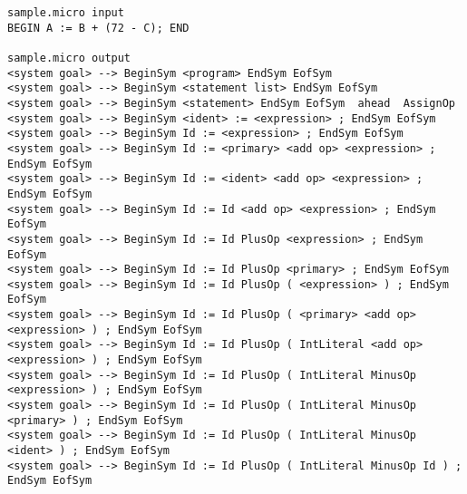 \documentclass[a4paper]{article}
\begin{document}
\begin{verbatim}
sample.micro input
BEGIN A := B + (72 - C); END

sample.micro output
<system goal> --> BeginSym <program> EndSym EofSym
<system goal> --> BeginSym <statement list> EndSym EofSym
<system goal> --> BeginSym <statement> EndSym EofSym  ahead  AssignOp
<system goal> --> BeginSym <ident> := <expression> ; EndSym EofSym
<system goal> --> BeginSym Id := <expression> ; EndSym EofSym
<system goal> --> BeginSym Id := <primary> <add op> <expression> ; EndSym EofSym
<system goal> --> BeginSym Id := <ident> <add op> <expression> ; EndSym EofSym
<system goal> --> BeginSym Id := Id <add op> <expression> ; EndSym EofSym
<system goal> --> BeginSym Id := Id PlusOp <expression> ; EndSym EofSym
<system goal> --> BeginSym Id := Id PlusOp <primary> ; EndSym EofSym
<system goal> --> BeginSym Id := Id PlusOp ( <expression> ) ; EndSym EofSym
<system goal> --> BeginSym Id := Id PlusOp ( <primary> <add op> <expression> ) ; EndSym EofSym
<system goal> --> BeginSym Id := Id PlusOp ( IntLiteral <add op> <expression> ) ; EndSym EofSym
<system goal> --> BeginSym Id := Id PlusOp ( IntLiteral MinusOp <expression> ) ; EndSym EofSym
<system goal> --> BeginSym Id := Id PlusOp ( IntLiteral MinusOp <primary> ) ; EndSym EofSym
<system goal> --> BeginSym Id := Id PlusOp ( IntLiteral MinusOp <ident> ) ; EndSym EofSym
<system goal> --> BeginSym Id := Id PlusOp ( IntLiteral MinusOp Id ) ; EndSym EofSym
\end{verbatim}
\end{document}
